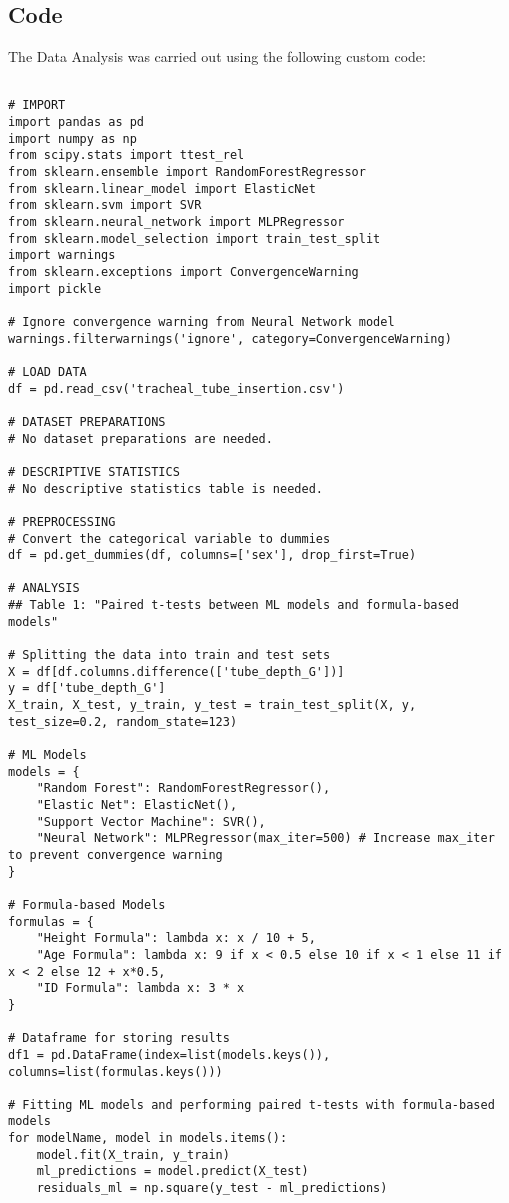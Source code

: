 \documentclass[11pt]{article}
\begin{document}
\subsection{{Code}}
The Data Analysis was carried out using the following custom code:

\begin{verbatim}

# IMPORT
import pandas as pd
import numpy as np
from scipy.stats import ttest_rel
from sklearn.ensemble import RandomForestRegressor
from sklearn.linear_model import ElasticNet
from sklearn.svm import SVR
from sklearn.neural_network import MLPRegressor
from sklearn.model_selection import train_test_split
import warnings
from sklearn.exceptions import ConvergenceWarning
import pickle

# Ignore convergence warning from Neural Network model
warnings.filterwarnings('ignore', category=ConvergenceWarning)

# LOAD DATA
df = pd.read_csv('tracheal_tube_insertion.csv')

# DATASET PREPARATIONS
# No dataset preparations are needed.

# DESCRIPTIVE STATISTICS
# No descriptive statistics table is needed.

# PREPROCESSING
# Convert the categorical variable to dummies
df = pd.get_dummies(df, columns=['sex'], drop_first=True)

# ANALYSIS
## Table 1: "Paired t-tests between ML models and formula-based models"

# Splitting the data into train and test sets
X = df[df.columns.difference(['tube_depth_G'])]
y = df['tube_depth_G']
X_train, X_test, y_train, y_test = train_test_split(X, y, test_size=0.2, random_state=123)

# ML Models
models = {
    "Random Forest": RandomForestRegressor(),
    "Elastic Net": ElasticNet(),
    "Support Vector Machine": SVR(),
    "Neural Network": MLPRegressor(max_iter=500) # Increase max_iter to prevent convergence warning
}

# Formula-based Models
formulas = {
    "Height Formula": lambda x: x / 10 + 5,
    "Age Formula": lambda x: 9 if x < 0.5 else 10 if x < 1 else 11 if x < 2 else 12 + x*0.5,
    "ID Formula": lambda x: 3 * x
}

# Dataframe for storing results
df1 = pd.DataFrame(index=list(models.keys()), columns=list(formulas.keys()))

# Fitting ML models and performing paired t-tests with formula-based models
for modelName, model in models.items():
    model.fit(X_train, y_train)
    ml_predictions = model.predict(X_test)
    residuals_ml = np.square(y_test - ml_predictions)
    

\end{verbatim}
\end{document}

